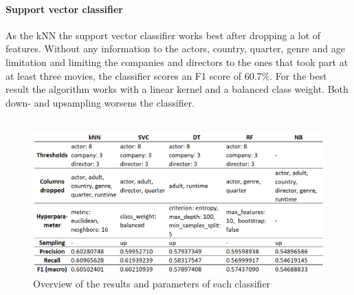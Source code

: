 \paragraph{Support vector classifier}
As the kNN the support vector classifier works best after dropping a lot of features. Without any information to the actors, country, quarter, genre and age limitation and limiting the companies and directors to the ones that took part at at least three movies, the classifier scores an F1 score of 60.7\%. For the best result the algorithm works with a linear kernel and a balanced class weight. Both down- and upsampling worsens the classifier.
\\ \\
\begin{figure}[h]
\includegraphics[width=\textwidth]{images/Classifier.png}
	\caption[Overview of the results and parameters of each classifier]{Overview of the results and parameters of each classifier\footnotemark}
\label{img:classifiers}
\end{figure}
\FloatBarrier
{}


